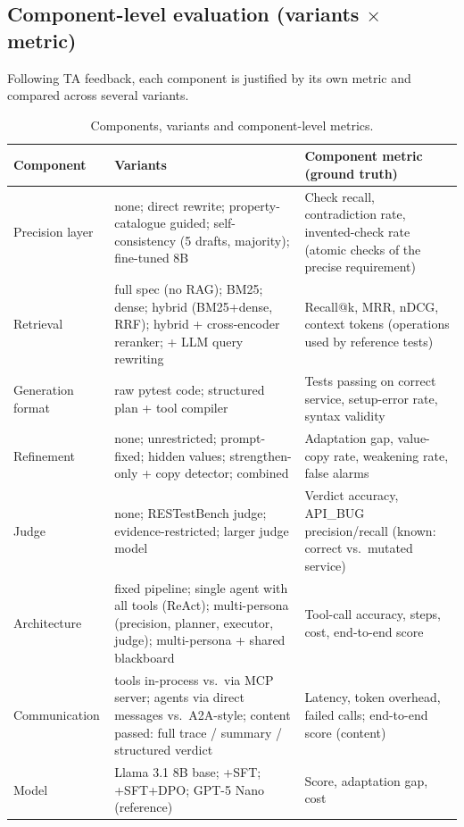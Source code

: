 \documentclass[11pt,a4paper]{article}
\begin{document}
\subsection{Component-level evaluation (variants $\times$ metric)}
Following TA feedback, each component is justified by its own metric and compared across several variants.
\begin{table}[H]
\centering\small
\begin{tabularx}{\linewidth}{@{}P{2.6cm}LL@{}}
\toprule
\textbf{Component} & \textbf{Variants} & \textbf{Component metric (ground truth)}\\
\midrule
Precision layer & none; direct rewrite; property-catalogue guided; self-consistency (5 drafts, majority); fine-tuned 8B & Check recall, contradiction rate, invented-check rate (atomic checks of the precise requirement)\\
Retrieval & full spec (no RAG); BM25; dense; hybrid (BM25+dense, RRF); hybrid + cross-encoder reranker; + LLM query rewriting & Recall@k, MRR, nDCG, context tokens (operations used by reference tests)\\
Generation format & raw pytest code; structured plan + tool compiler & Tests passing on correct service, setup-error rate, syntax validity\\
Refinement & none; unrestricted; prompt-fixed; hidden values; strengthen-only + copy detector; combined & Adaptation gap, value-copy rate, weakening rate, false alarms\\
Judge & none; RESTestBench judge; evidence-restricted; larger judge model & Verdict accuracy, \textsc{API\_BUG} precision/recall (known: correct vs.\ mutated service)\\
Architecture & fixed pipeline; single agent with all tools (ReAct); multi-persona (precision, planner, executor, judge); multi-persona + shared blackboard & Tool-call accuracy, steps, cost, end-to-end score\\
Communication & tools in-process vs.\ via MCP server; agents via direct messages vs.\ A2A-style; content passed: full trace / summary / structured verdict & Latency, token overhead, failed calls; end-to-end score (content)\\
Model & Llama 3.1 8B base; +SFT; +SFT+DPO; GPT-5 Nano (reference) & Score, adaptation gap, cost\\
\bottomrule
\end{tabularx}
\caption{Components, variants and component-level metrics.}
\end{table}
\end{document}
